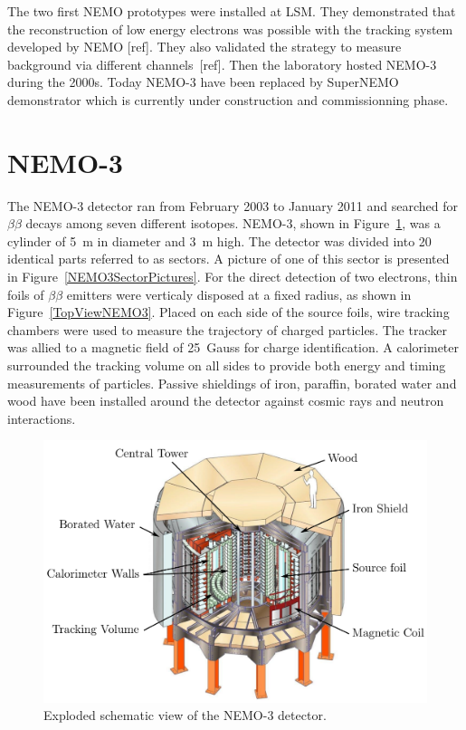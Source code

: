\documentclass[main.tex]{subfiles}
\begin{document}
\bigskip


\NI The two first NEMO prototypes were installed at LSM. They demonstrated that the reconstruction of low energy electrons was possible with the tracking system developed by NEMO [ref]. They also validated the strategy to measure background via different channels~[ref]. Then the laboratory hosted NEMO-3 during the 2000s. Today NEMO-3 have been replaced by SuperNEMO demonstrator which is currently under construction and commissionning phase.


\FloatBarrier


\section{NEMO-3}\label{sec:NEMO3}


\NI The NEMO-3 detector ran from February 2003 to January 2011 and searched for $\beta\beta$ decays among seven different isotopes. NEMO-3, shown in Figure~\ref{NEMO3Detector}, was a cylinder of 5~m in diameter and 3~m high. The detector was divided into 20 identical parts referred to as sectors. A picture of one of this sector is presented in Figure~\ref{NEMO3SectorPictures}. For the direct detection of two electrons, thin foils of $\beta\beta$ emitters were verticaly disposed at a fixed radius, as shown in Figure~\ref{TopViewNEMO3}. Placed on each side of the source foils, wire tracking chambers were used to measure the trajectory of charged particles. The tracker was allied to a magnetic field of 25~Gauss for charge identification. A calorimeter surrounded the tracking volume on all sides to provide both energy and timing measurements of particles. Passive shieldings of iron, paraffin, borated water and wood have been installed around the detector against cosmic rays and neutron interactions.


\begin{figure}[h!]
\begin{center}
\includegraphics[scale=0.35]{pictures/Chap2/NEMO-3-Schema.png}
\caption{Exploded schematic view of the NEMO-3 detector.}
\label{NEMO3Detector}
\end{center}
\end{figure}
\end{document}
